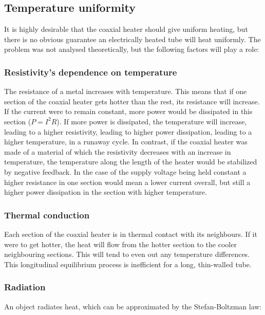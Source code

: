 \subsection{Temperature uniformity}
\label{sec:Uniformity}

It is highly desirable that the coaxial heater should give uniform heating, but
there is no obvious guarantee an electrically heated tube will heat uniformly.
The problem was not analysed theoretically, but the following factors will
play a role:

\subsubsection{Resistivity's dependence on temperature}

The resistance of a metal increases with temperature. This means that if one
section of the coaxial heater gets hotter than the rest, its resistance
will increase. If the current were to remain constant, more power would be
dissipated in this section (\(P=I^2R\)). If more power is dissipated, the
temperature will increase, leading to a higher resistivity, leading to higher
power dissipation, leading to a higher temperature, in a runaway cycle. In
contrast, if the coaxial heater was made of a material of which the resistivity
decreases with an increase in temperature, the temperature along the length of
the heater would be stabilized by negative feedback. In the case of the supply
voltage being held constant a higher resistance in one section would mean a
lower current overall, but still a higher power dissipation in the section with
higher temperature.

\subsubsection{Thermal conduction}

Each section of the coaxial heater is in thermal contact with its neighbours. If
it were to get hotter, the heat will flow from the hotter section to the cooler
neighbouring sections. This will tend to even out any temperature differences.
This longitudinal equilibrium process is inefficient for a long, thin-walled
tube.

\subsubsection{Radiation}

An object radiates heat, which can be approximated by the Stefan-Boltzman law:

